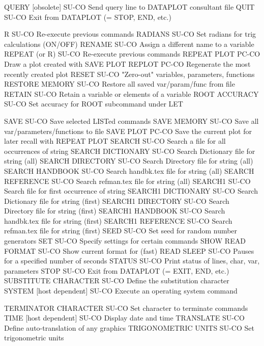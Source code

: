QUERY       [obsolete]      SU-CO Send query line to DATAPLOT consultant file
QUIT                        SU-CO Exit from DATAPLOT (= STOP, END, etc.)

R                           SU-CO Re-execute previous commands
RADIANS                     SU-CO Set radians for trig calculations (ON/OFF)
RENAME                      SU-CO Assign a different name to a variable
REPEAT (or R)               SU-CO Re-execute previous commands
REPEAT PLOT                 PC-CO Draw a plot created with SAVE PLOT
REPLOT                      PC-CO Regenerate the most recently created plot
RESET                       SU-CO "Zero-out" variables, parameters, functions 
RESTORE MEMORY              SU-CO Restore all saved var/param/func from file
RETAIN                      SU-CO Retain a variable or elements of a variable
ROOT ACCURACY               SU-CO Set accuracy for ROOT subcommand under LET

SAVE                        SU-CO Save selected LISTed commands
SAVE MEMORY                 SU-CO Save all var/parameters/functions to file
SAVE PLOT                   PC-CO Save the current plot for later recall with REPEAT PLOT
SEARCH                      SU-CO Search a file for all occurrences of string
SEARCH DICTIONARY           SU-CO Search Dictionary file for string (all)
SEARCH DIRECTORY            SU-CO Search Directory file for string (all)
SEARCH HANDBOOK             SU-CO Search handbk.tex file for string (all)
SEARCH REFERENCE            SU-CO Search refman.tex file for string (all)
SEARCH1                     SU-CO Search file for first occurrence of string
SEARCH1 DICTIONARY          SU-CO Search Dictionary file for string (first)
SEARCH1 DIRECTORY           SU-CO Search Directory file for string (first)
SEARCH1 HANDBOOK            SU-CO Search handbk.tex file for string (first)
SEARCH1 REFERENCE           SU-CO Search refman.tex file for string (first)
SEED                        SU-CO Set seed for random number generators
SET                         SU-CO Specify settings for certain commands
SHOW READ FORMAT            SU-CO Show current format for (fast) READ
SLEEP                       SU-CO Pauses for a specified number of seconds
STATUS                      SU-CO Print status of lines, char, var, parameters
STOP                        SU-CO Exit from DATAPLOT (= EXIT, END, etc.)
SUBSTITUTE CHARACTER        SU-CO Define the substitution character 
SYSTEM [host dependent]     SU-CO Execute an operating system command

TERMINATOR CHARACTER        SU-CO Set character to terminate commands
TIME   [host dependent]     SU-CO Display date and time
TRANSLATE                   SU-CO Define auto-translation of any graphics
TRIGONOMETRIC UNITS         SU-CO Set trigonometric units

